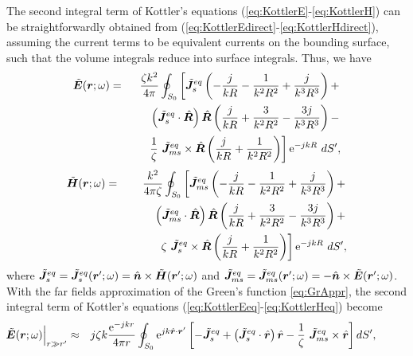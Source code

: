 \par The second integral term of Kottler's equations (\ref{eq:KottlerE}-\ref{eq:KottlerH}) can be straightforwardly obtained from  (\ref{eq:KottlerEdirect}-\ref{eq:KottlerHdirect}), assuming the current terms to be equivalent currents on the bounding surface, such that the volume integrals reduce into surface integrals. Thus, we have
\begin{eqnarray}
\label{eq:KottlerEeq}
\tilde{\mbfit{E}}(\mbfit{r}; \omega) &= & \frac{\zeta k^2}{4 \pi} \oint_{S_0} \left [  \tilde{\mbfit{J}}_s^{eq} \left ( - \frac{j}{kR} - \frac{1}{k^2R^2} + \frac{j}{k^3R^3} \right )  +  \right. \nonumber \\
& & \hspace{.5cm} \left. \left ( \tilde{\mbfit{J}}_s^{eq} \cdot \hat{\mbfit{R}} \right ) \hat{\mbfit{R}} \left (\frac{j}{kR} + \frac{3}{k^2R^2} - \frac{3j}{k^3R^3} \right) - \right. \nonumber \\
& & \hspace{.5cm} \left. \frac{1}{\zeta} \ \tilde{\mbfit{J}}_{ms}^{eq}  \times \hat{\mbfit{R}} \left ( \frac{j}{kR} + \frac{1}{k^2R^2} \right ) \right ] \mrm{e}^{-jkR} \ dS',
\end{eqnarray}
\begin{eqnarray}
\label{eq:KottlerHeq}
\tilde{\mbfit{H}}(\mbfit{r}; \omega) &= & \frac{k^2}{4 \pi \zeta} \oint_{S_0} \left [ \tilde{\mbfit{J}}_{ms}^{eq} \left ( - \frac{j}{kR} - \frac{1}{k^2R^2} + \frac{j}{k^3R^3} \right ) + \right. \nonumber \\
& & \hspace{.5cm} \left. \left ( \tilde{\mbfit{J}}_{ms}^{eq} \cdot \hat{\mbfit{R}} \right ) \hat{\mbfit{R}} \left (\frac{j}{kR} + \frac{3}{k^2R^2} - \frac{3j}{k^3R^3} \right) + \right. \nonumber \\
& & \hspace{1cm} \left. \zeta \ \tilde{\mbfit{J}}_s^{eq}  \times \hat{\mbfit{R}} \left ( \frac{j}{kR} + \frac{1}{k^2R^2} \right ) \right ] \mrm{e}^{-jkR} \ dS',
\end{eqnarray} where $\tilde{\mbfit{J}}_s^{eq} = \tilde{\mbfit{J}}_s^{eq}(\mbfit{r'}; \omega) = \hat{\mbfit{n}} \times \tilde{\mbfit{H}}(\mbfit{r'}; \omega)$ and $\tilde{\mbfit{J}}_{ms}^{eq} = \tilde{\mbfit{J}}_{ms}^{eq}(\mbfit{r'}; \omega) =- \hat{\mbfit{n}} \times \tilde{\mbfit{E}}(\mbfit{r'}; \omega)$. With the far fields approximation of the Green's function \eqref{eq:GrAppr}, the second integral term of Kottler's equations (\ref{eq:KottlerEeq}-\ref{eq:KottlerHeq}) become
\begin{eqnarray}
\label{eq:KottlerEN2Fapprox}
\hspace{-1cm} \tilde{\mbfit{E}}(\mbfit{r}; \omega) \Big|_{r \gg r'}  &\approx& j \zeta k \frac{\mrm{e}^{-jk r}}{4\pi r} \oint_{S_0}  \mrm{e}^{jk \hat{\mbfit{r}} \cdot \mbfit{r'}} \left [ - \tilde{\mbfit{J}}_s^{eq}  + \left ( \tilde{\mbfit{J}}_s^{eq} \cdot \hat{\mbfit{r}} \right ) \hat{\mbfit{r}} - \frac{1}{\zeta} \ \tilde{\mbfit{J}}_{ms}^{eq}  \times \hat{\mbfit{r}} \right ]  dS',
\end{eqnarray}

